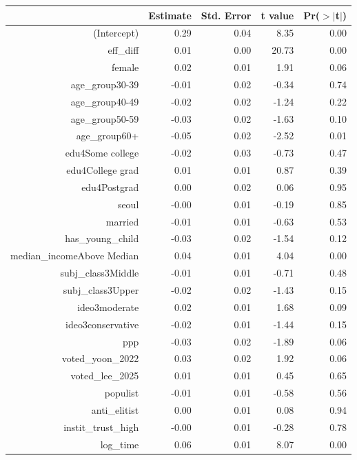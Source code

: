 \begin{tabular}{rrrrr}
  \toprule
 & Estimate & Std. Error & t value & Pr($>$$|$t$|$) \\ 
  \midrule
(Intercept) & 0.29 & 0.04 & 8.35 & 0.00 \\ 
  eff\_diff & 0.01 & 0.00 & 20.73 & 0.00 \\ 
  female & 0.02 & 0.01 & 1.91 & 0.06 \\ 
  age\_group30-39 & -0.01 & 0.02 & -0.34 & 0.74 \\ 
  age\_group40-49 & -0.02 & 0.02 & -1.24 & 0.22 \\ 
  age\_group50-59 & -0.03 & 0.02 & -1.63 & 0.10 \\ 
  age\_group60+ & -0.05 & 0.02 & -2.52 & 0.01 \\ 
  edu4Some college & -0.02 & 0.03 & -0.73 & 0.47 \\ 
  edu4College grad & 0.01 & 0.01 & 0.87 & 0.39 \\ 
  edu4Postgrad & 0.00 & 0.02 & 0.06 & 0.95 \\ 
  seoul & -0.00 & 0.01 & -0.19 & 0.85 \\ 
  married & -0.01 & 0.01 & -0.63 & 0.53 \\ 
  has\_young\_child & -0.03 & 0.02 & -1.54 & 0.12 \\ 
  median\_incomeAbove Median & 0.04 & 0.01 & 4.04 & 0.00 \\ 
  subj\_class3Middle & -0.01 & 0.01 & -0.71 & 0.48 \\ 
  subj\_class3Upper & -0.02 & 0.02 & -1.43 & 0.15 \\ 
  ideo3moderate & 0.02 & 0.01 & 1.68 & 0.09 \\ 
  ideo3conservative & -0.02 & 0.01 & -1.44 & 0.15 \\ 
  ppp & -0.03 & 0.02 & -1.89 & 0.06 \\ 
  voted\_yoon\_2022 & 0.03 & 0.02 & 1.92 & 0.06 \\ 
  voted\_lee\_2025 & 0.01 & 0.01 & 0.45 & 0.65 \\ 
  populist & -0.01 & 0.01 & -0.58 & 0.56 \\ 
  anti\_elitist & 0.00 & 0.01 & 0.08 & 0.94 \\ 
  instit\_trust\_high & -0.00 & 0.01 & -0.28 & 0.78 \\ 
  log\_time & 0.06 & 0.01 & 8.07 & 0.00 \\ 
   \bottomrule
\end{tabular}
